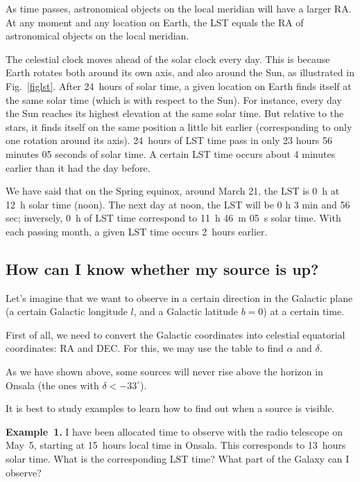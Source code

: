 As time passes, 
astronomical objects on the local meridian will have a larger RA.
At any moment and any location on Earth, 
the LST equals the RA of astronomical objects on the
local meridian. 

The celestial clock moves ahead of the solar clock every day. This 
is because Earth rotates both around its own axis, and also around the
Sun, as illustrated in Fig.~\ref{figlst}. 
After 24~hours of solar time, a given location on Earth 
finds itself at the same solar time (which is with respect to the Sun). 
For instance, every day the Sun reaches its highest elevation at the same 
solar time. 
But relative to the stars, it finds itself on 
the same position a little bit earlier (corresponding
to only one rotation around its axis). 24~hours of LST time
pass in only 
23 hours 56 minutes 05 seconds of solar time. A certain LST time
occurs about 4 minutes earlier than it had the day before. 

We have said that on the Spring equinox, around March 21, the LST is 0~h
at 12~h solar time (noon). The next day at noon, 
the LST will be 0 h 3 min and 56 sec; inversely, 0~h of LST time
correspond to 11~h 46~m 05~s solar time. 
With each passing month, a given LST time occurs 2~hours earlier. 

\subsection{How can I know whether my source is up?}
\label{app:visiblecoords}

Let's imagine that we want to observe in a certain direction in the
Galactic plane (a certain Galactic longitude $l$, and a Galactic 
latitude $b=0$) at a certain time. 

First of all, we need to convert the Galactic coordinates into 
celestial equatorial coordinates: RA and DEC. For this, we may use
the table to find $\alpha$ and $\delta$. 

As we have shown above, some sources will never rise above the horizon in Onsala 
(the ones with $\delta < -33^\circ$).   

It is best to study examples 
to learn how to find out when a source is visible. 

\bigskip
{\bf Example~1.} I have been allocated time to observe with the radio telescope
on May~5, starting at 15~hours local time in Onsala.  
This corresponds to 13~hours solar time. 
What is the corresponding LST time? What part of the Galaxy can I observe? 

